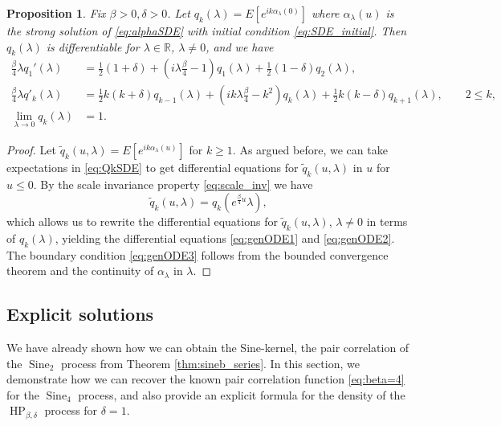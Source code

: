 \documentclass[12pt]{article}
\newtheorem{proposition}[theorem]{Proposition}
\theoremstyle{definition} %
\newcommand{\R}{{\mathbb R}}
\theoremstyle{remark} %
\newcommand{\Sine}{\operatorname{Sine}}
\newcommand{\HPb}{\operatorname{HP}_{\beta, \delta}}
\begin{document}
\begin{proposition}\label{prop:ODE_gen}
Fix $\beta>0, \delta>0$. Let $q_k(\lambda)=E[e^{i k \alpha_{\lambda}(0)}]$ where $\alpha_\lambda(u)$ is the strong solution of \eqref{eq:alphaSDE} with initial condition \eqref{eq:SDE_initial}. Then $q_k(\lambda)$ is differentiable for $\lambda\in \R$, $\lambda\neq 0$, and we have
\begin{align}\label{eq:genODE1}
     \tfrac{\beta}{4}\lambda q_{1}'(\lambda)&=\tfrac{1}{2}(1+\delta)+(i \lambda \tfrac{\beta}{4}-1) q_{1}(\lambda)+\tfrac{1}{2}(1-\delta)q_{2}(\lambda),\\\label{eq:genODE2}
   \tfrac{\beta}{4} \lambda q'_{k}(\lambda)&=\tfrac{1}{2} k(k+\delta) q_{k-1}(\lambda)+(i k \lambda \tfrac{\beta}{4}-k^2)q_{k}(\lambda)+\tfrac{1}{2} k (k-\delta )q_{k+1}(\lambda), \qquad 2\le k,\\
    \lim_{\lambda\to 0}q_{k}(\lambda)&=1. \label{eq:genODE3}
\end{align}    
\end{proposition}
\begin{proof}
Let $\tilde q_k(u,\lambda)=E[e^{i k \alpha_\lambda(u)}]$ for $k\ge 1$. 
As argued before, we can take expectations in \eqref{eq:QkSDE} to get differential equations for $\tilde q_k(u,\lambda)$ in $u$ for $u\le 0$. By the scale invariance property \eqref{eq:scale_inv} we have 
\[
\tilde q_k(u,\lambda)=q_k(e^{\frac{\beta}{4} u} \lambda),
\]
which allows us to rewrite the differential equations for $\tilde q_k(u,\lambda)$, $\lambda\neq 0$ 
in terms of $q_k(\lambda)$, yielding the differential equations  \eqref{eq:genODE1} and \eqref{eq:genODE2}. The boundary condition \eqref{eq:genODE3} follows from the bounded convergence theorem and the continuity of $\alpha_\lambda$ in $\lambda$. 
\end{proof}




    
\subsection{Explicit solutions}

We have already shown how we can obtain the Sine-kernel, the pair correlation of the $\Sine_2$ process from Theorem \ref{thm:sineb_series}. In this section, we demonstrate how we can recover the known pair correlation function \eqref{eq:beta=4} for the $\operatorname{Sine}_4$ process, and also provide an explicit formula for the density of the $\HPb$ process for $\delta=1$. 
\end{document}
